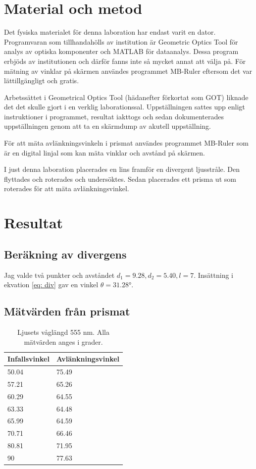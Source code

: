 \documentclass[a4paper]{article}
\begin{document}
\section{Material och metod}
Det fysiska materialet för denna laboration har endast varit en dator. Programvaran som tillhandahölls
av institution är Geometric Optics Tool för analys av optiska komponenter och MATLAB för dataanalys. 
Dessa program erbjöds av institutionen och därför fanns inte så mycket annat att välja på. För mätning
av vinklar på skärmen användes programmet MB-Ruler eftersom det var lättillgängligt och gratis.

Arbetssättet i Geometrical Optics Tool (hädanefter förkortat som GOT) liknade det det skulle gjort
i en verklig laborationssal. Uppställningen sattes upp enligt instruktioner i programmet, 
resultat iakttogs och sedan dokumenterades uppställningen genom att ta en skärmdump av akutell uppställning.

För att mäta avlänkningsvinkeln i prismat användes programmet MB-Ruler som är en digital linjal
som kan mäta vinklar och avstånd på skärmen.

I just denna laboration placerades en lins framför en divergent ljusstråle. Den flyttades och roterades och undersöktes.
Sedan placerades ett prisma ut som roterades för att mäta avlänkningsvinkel. 
\section{Resultat}
\subsection{Beräkning av divergens} \label{div}
Jag valde två punkter och avståndet $d_1 = 9.28, d_2 = 5.40, l = 7$.
Insättning i ekvation \ref{eq: div} gav en vinkel $\theta = \ang{31.28}$.

\subsection{Mätvärden från prismat}

\begin{table}[h]
    \begin{tabular}{|l|l|}
    \hline
    Infallsvinkel & Avlänkningsvinkel \\ \hline
    50.04         & 75.49             \\ \hline
    57.21         & 65.26             \\ \hline
    60.29         & 64.55             \\ \hline
    63.33         & 64.48             \\ \hline
    65.99         & 64.59             \\ \hline
    70.71         & 66.46             \\ \hline
    80.81         & 71.95             \\ \hline
    90            & 77.63             \\ \hline
    \end{tabular}
    \caption{Ljusets våglängd 555 nm. Alla mätvärden anges i grader.}
    \label{tb:555}
\end{table}
\end{document}
